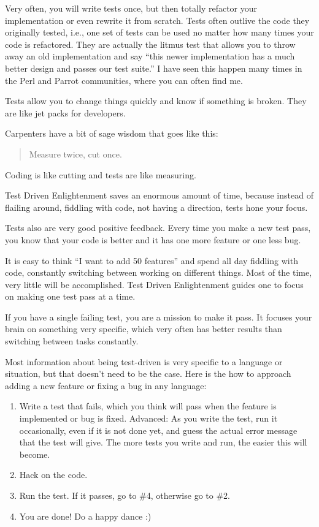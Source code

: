 Very often, you will write tests once, but then totally refactor your implementation or even rewrite it from scratch. Tests often outlive the code they originally tested, i.e., one set of tests can be used no matter how many times your code is refactored. They are actually the litmus test that allows you to throw away an old implementation and say ``this newer implementation has a much better design and passes our test suite.'' I have seen this happen many times in the Perl and Parrot communities, where you can often find me.

Tests allow you to change things quickly and know if something is broken. They are like jet packs for developers.

Carpenters have a bit of sage wisdom that goes like this:
\begin{quote}Measure twice, cut once.\end{quote} 

Coding is like cutting and tests are like measuring.

Test Driven Enlightenment saves an enormous amount of time, because instead of flailing around, fiddling with code, not having a direction, tests hone your focus.

Tests also are very good positive feedback. Every time you make a new test pass, you know that your code is better and it has one more feature or one less bug.

It is easy to think ``I want to add 50 features'' and spend all day fiddling with code, constantly switching between working on different things. Most of the time, very little will be accomplished. Test Driven Enlightenment guides one to focus on making one test pass at a time.

If you have a single failing test, you are a mission to make it pass. It focuses your brain on something very specific, which very often has better results than switching between tasks constantly.

Most information about being test-driven is very specific to a language or situation, but that doesn't need to be the case. Here is the how to approach adding a new feature or fixing a bug in any language:
\begin{enumerate}
 \item Write a test that fails, which you think will pass when the feature is implemented or bug is fixed. Advanced: As you write the test, run it occasionally, even if it is not done yet, and guess the actual error message that the test will give. The more tests you write and run, the easier this will become.
 \item Hack on the code.
 \item Run the test. If it passes, go to \#4, otherwise go to \#2.
 \item You are done! Do a happy dance :)
\end{enumerate}

